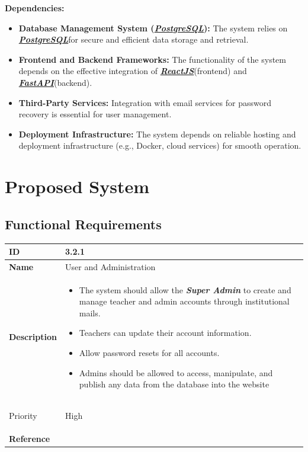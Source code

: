 \documentclass[11pt]{article}
\newcommand{\ReactJS}{\href{https://react.dev/}{\textbf{\textcolor{reactColor}{\textit{ReactJS}}}}}
\newcommand{\FastAPI}{\href{https://fastapi.tiangolo.com/}{\textbf{{\textcolor{fastAPIColor}{\textit{FastAPI}}}}}}
\newcommand{\PostgreSQL}{\href{https://www.postgresql.org/}{\textbf{{\textcolor{postgresColor}{\textit{PostgreSQL}}}}}}
\begin{document}
\textbf{Dependencies:}
\begin{itemize}
    \item \textbf{Database Management System (\PostgreSQL):} The system relies on \PostgreSQL\space for secure and efficient data storage and retrieval.
    \item \textbf{Frontend and Backend Frameworks:} The functionality of the system depends on the effective integration of \ReactJS \space (frontend) and \FastAPI\space (backend).
    \item \textbf{Third-Party Services:} Integration with email services for password recovery is essential for user management.
    \item \textbf{Deployment Infrastructure:} The system depends on reliable hosting and deployment infrastructure (e.g., Docker, cloud services) for smooth operation.
\end{itemize}

\section{Proposed System}

\subsection{Functional Requirements}
\renewcommand{\arraystretch}{2}
\noindent
\begin{center}
\begin{tabular}{ | >{\bfseries}m{5em} | m{10cm} |  } 
  \hline
  ID & 3.2.1\\ 
  \hline
  Name & User and Administration \\ 
  \hline
  Description & 
  \begin{itemize}
      \item The system should allow the \textit{\textbf{Super Admin}} to create and manage teacher and admin accounts through institutional mails.
      \item Teachers can update their account information.
      \item Allow password resets for all accounts.
      \item Admins should be allowed to access, manipulate, and publish any data from the database into the website

  \end{itemize} \\
  \hline
  
  Priority & High\\
  \hline 
  Reference & \\
  \hline
\end{tabular}
\end{center}
\end{document}

